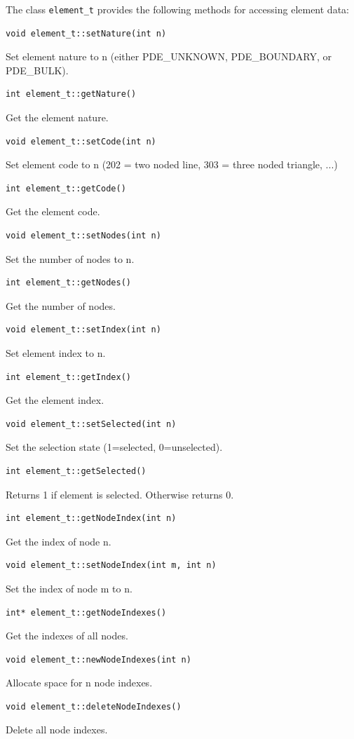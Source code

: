 The class {\tt element\_t} provides the following methods for accessing element data:
\begin{verbatim} 
void element_t::setNature(int n)
\end{verbatim}
Set element nature to n (either PDE\_UNKNOWN, PDE\_BOUNDARY, or PDE\_BULK).
\begin{verbatim}
int element_t::getNature()
\end{verbatim}
Get the element nature.
\begin{verbatim}
void element_t::setCode(int n)
\end{verbatim}
Set element code to n (202 = two noded line, 303 = three noded triangle, ...)
\begin{verbatim}
int element_t::getCode()
\end{verbatim}
Get the element code.
\begin{verbatim}
void element_t::setNodes(int n)
\end{verbatim}
Set the number of nodes to n.
\begin{verbatim}
int element_t::getNodes()
\end{verbatim}
Get the number of nodes.
\begin{verbatim}
void element_t::setIndex(int n)
\end{verbatim}
Set element index to n.
\begin{verbatim}
int element_t::getIndex()
\end{verbatim}
Get the element index.
\begin{verbatim}
void element_t::setSelected(int n)
\end{verbatim}
Set the selection state (1=selected, 0=unselected).
\begin{verbatim}
int element_t::getSelected()
\end{verbatim}
Returns 1 if element is selected. Otherwise returns 0.
\begin{verbatim}
int element_t::getNodeIndex(int n)
\end{verbatim}
Get the index of node n.
\begin{verbatim}
void element_t::setNodeIndex(int m, int n)
\end{verbatim}
Set the index of node m to n.
\begin{verbatim}
int* element_t::getNodeIndexes()
\end{verbatim}
Get the indexes of all nodes.
\begin{verbatim}
void element_t::newNodeIndexes(int n)
\end{verbatim}
Allocate space for n node indexes.
\begin{verbatim}
void element_t::deleteNodeIndexes()
\end{verbatim}
Delete all node indexes.

